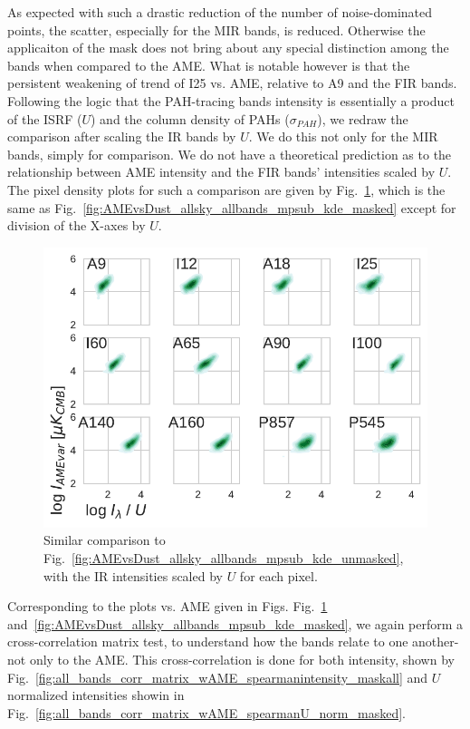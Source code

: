             As expected with such a drastic reduction of the number of noise-dominated points, the scatter, especially for the MIR bands, is reduced. Otherwise the applicaiton of the mask does not bring about any special distinction among the bands when compared to the AME. What is notable however is that the persistent weakening of trend of I25 vs. AME, relative to A9 and the FIR bands. Following the logic that the PAH-tracing bands intensity is essentially a product of the ISRF ($U$) and the column density of PAHs ($\sigma_{PAH}$), we redraw the comparison after scaling the IR bands by $U$. We do this not only for the MIR bands, simply for comparison. We do not have a theoretical prediction as to the relationship between AME intensity and the FIR bands' intensities scaled by $U$. The pixel density plots for such a comparison are given by Fig.~\ref{fig:AMEvsDust_allsky_allbands_mpsub_UNorm_kde_masked}, which is the same as Fig.~\ref{fig:AMEvsDust_allsky_allbands_mpsub_kde_masked} except for division of the X-axes by $U$.
              \begin{figure}
                \includegraphics[width=\textwidth]{../Plots/ch_allsky/AMEvsDust_allsky_allbands_mpsub_UNorm_kde_masked.pdf}
                \centering
                \caption{Similar comparison to Fig.~\ref{fig:AMEvsDust_allsky_allbands_mpsub_kde_unmasked}, with the IR intensities scaled by $U$ for each pixel. }
                \label{fig:AMEvsDust_allsky_allbands_mpsub_UNorm_kde_masked}
              \end{figure}
            Corresponding to the plots vs. AME given in Figs. Fig.~\ref{fig:AMEvsDust_allsky_allbands_mpsub_UNorm_kde_masked} and~\ref{fig:AMEvsDust_allsky_allbands_mpsub_kde_masked}, we again perform a cross-correlation matrix test, to understand how the bands relate to one another- not only to the AME. This cross-correlation is done for both intensity, shown by Fig.~\ref{fig:all_bands_corr_matrix_wAME_spearmanintensity_maskall} and $U$ normalized intensities showin in Fig.~\ref{fig:all_bands_corr_matrix_wAME_spearmanU_norm_masked}.
